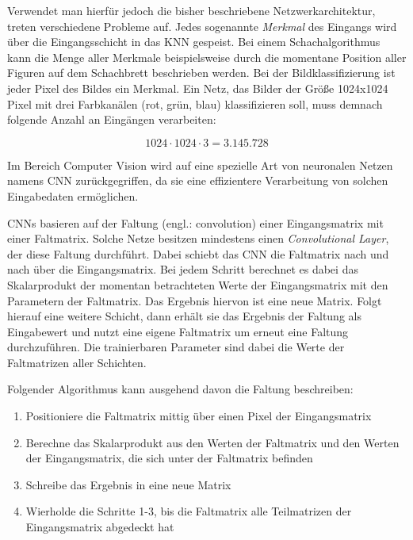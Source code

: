 Verwendet man hierfür jedoch die bisher beschriebene Netzwerkarchitektur, treten verschiedene Probleme auf. Jedes sogenannte \emph{Merkmal} des Eingangs wird über die Eingangsschicht in das \ac{KNN} gespeist. Bei einem Schachalgorithmus kann die Menge aller Merkmale beispielsweise durch die momentane Position aller Figuren auf dem Schachbrett beschrieben werden. Bei der Bildklassifizierung ist jeder Pixel des Bildes ein Merkmal. Ein Netz, das Bilder der Größe 1024x1024 Pixel mit drei Farbkanälen (rot, grün, blau) klassifizieren soll, muss demnach folgende Anzahl an Eingängen verarbeiten: \cite{knnsKompakt}

\begin{equation}
   1024 \cdot 1024 \cdot 3 = 3.145.728
\end{equation}

Im Bereich Computer Vision wird auf eine spezielle Art von neuronalen Netzen namens \ac{CNN} zurückgegriffen, da sie eine effizientere Verarbeitung von solchen Eingabedaten ermöglichen. \cite{knnsKompakt} 

\acp{CNN} basieren auf der Faltung (engl.: convolution) einer Eingangsmatrix mit einer Faltmatrix. Solche Netze besitzen mindestens einen \emph{Convolutional Layer}, der diese Faltung durchführt. Dabei schiebt das \ac{CNN} die Faltmatrix nach und nach über die Eingangsmatrix. Bei jedem Schritt berechnet es dabei das Skalarprodukt der momentan betrachteten Werte der Eingangsmatrix mit den Parametern der Faltmatrix. Das Ergebnis hiervon ist eine neue Matrix. Folgt hierauf eine weitere Schicht, dann erhält sie das Ergebnis der Faltung als Eingabewert und nutzt eine eigene Faltmatrix um erneut eine Faltung durchzuführen. Die trainierbaren Parameter sind dabei die Werte der Faltmatrizen aller Schichten. \cite{DeepLearningBook}

Folgender Algorithmus kann ausgehend davon die Faltung beschreiben:
\begin{enumerate}
   \item Positioniere die Faltmatrix mittig über einen Pixel der Eingangsmatrix
   \item Berechne das Skalarprodukt aus den Werten der Faltmatrix und den Werten der Eingangsmatrix, die sich unter der Faltmatrix befinden
   \item Schreibe das Ergebnis in eine neue Matrix
   \item Wierholde die Schritte 1-3, bis die Faltmatrix alle Teilmatrizen der Eingangsmatrix abgedeckt hat
\end{enumerate}

